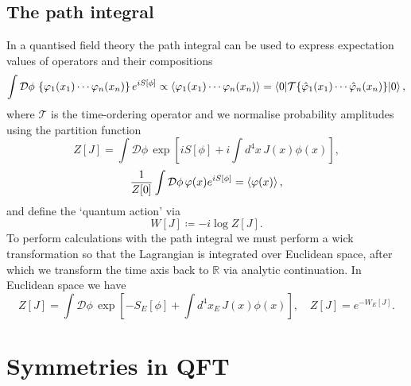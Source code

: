 \documentclass[11pt, a4paper]{article}
\begin{document}
\subsection{The path integral}
In a quantised field theory the path integral can be used to
express expectation values of operators and their compositions
\begin{equation}
  \int{\mathcal{D}\phi\,\left\{\varphi_1(x_1) \cdots \varphi_n(x_n)\right\}e^{iS[\phi]}} \propto
  \braket{{\varphi_1(x_1) \cdots \varphi_n(x_n)}} =
  \braket{0|\mathcal{T}\{\hat{\varphi}_1(x_1) \cdots \hat{\varphi}_n(x_n)\}|0},
\end{equation}
where $\mathcal{T}$ is the time-ordering operator and we normalise probability
amplitudes using the partition function
\begin{equation}
  Z[J] = \int{\mathcal{D}\phi\,\exp{\left[iS[\phi] + i\int{d^4x\, J(x)\phi(x) }\right]} },
\end{equation}
\begin{equation}
  \frac{1}{Z[0]}\int{\mathcal{D}\phi\,\varphi(x)e^{iS[\phi]}} = \braket{\varphi(x)},
\end{equation}
and define the `quantum action' via
\begin{equation}
  W[J] \coloneq -i\log{Z[J]}.
\end{equation}
To perform calculations with the path integral we must
perform a wick transformation so that the Lagrangian is integrated 
over Euclidean space, after which we transform the time axis 
back to $\mathbb{R}$ via analytic continuation. In Euclidean 
space we have
\begin{equation}
  Z[J] = \int{\mathcal{D}\phi\,\exp{\left[-S_E[\phi] +
  \int{d^4{x_E}\,J(x)\phi(x)}\right] }}, \quad Z[J] = e^{-W_E[J]}.
\end{equation}


\section{Symmetries in QFT}
\end{document}
